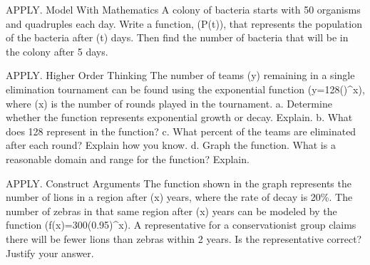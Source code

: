 \documentclass{article}
\newenvironment{practice}[2]{}{}        %
\newcommand{\answer}[1]{}               %
\newcommand{\placeholder}[2]{}          %
\newcommand{\te}[1]{}                   %
\begin{document}
\begin{practice}{27}{3}
APPLY. Model With Mathematics A colony of bacteria starts with 50 organisms and quadruples each day. Write a function, (P(t)), that represents the population of the bacteria after (t) days. Then find the number of bacteria that will be in the colony after 5 days.
\placeholder{illustration}{Two circular petri dishes containing green rod-shaped bacteria. Left sparse dish callout DAY 0: 50. Orange arrow points right to densely filled dish labeled DAY 5: ?.}
\answer{(P(t)=50(4)^x); 51,200 bacteria}
\te{Printed formula uses (x) although the function and prompt use (t); likely (P(t)=50(4)^t).}
\end{practice}
\begin{practice}{28}{2}
APPLY. Higher Order Thinking The number of teams (y) remaining in a single elimination tournament can be found using the exponential function (y=128()^x), where (x) is the number of rounds played in the tournament.
a. Determine whether the function represents exponential growth or decay. Explain.
b. What does 128 represent in the function?
c. What percent of the teams are eliminated after each round? Explain how you know.
d. Graph the function. What is a reasonable domain and range for the function? Explain.
\answer{a. decay; The base is less than 1. b. the initial number of teams in the tournament c. 50\%; the rate of decay is (\frac12). d. domain: (\{1,2,3,4,5,6,7\}); range: (\{1,2,4,8,16,32,64\}); the function only makes sense for 7 rounds. After the seventh round, there is only one team remaining.}
\placeholder{graph}{Answer 28d: seven isolated red filled points (1,64),(2,32),(3,16),(4,8),(5,4),(6,2),(7,1). No connecting segments. x window -2 to 10, grid step 1, labels 2,4,6,8; y window about -7.5 to 75, grid step 7.5, labels 15,30,45,60. Axes x,y arrows both ends, O at origin.}
\end{practice}
\begin{practice}{29}{2}
APPLY. Construct Arguments The function shown in the graph represents the number of lions in a region after (x) years, where the rate of decay is 20\%. The number of zebras in that same region after (x) years can be modeled by the function (f(x)=300(0.95)^x). A representative for a conservationist group claims there will be fewer lions than zebras within 2 years. Is the representative correct? Justify your answer.
\placeholder{graph}{Lion Population: blue decreasing curve with marked/labeled points (0,400),(4,164),(5,131), arrow at right near (9,55). Horizontal Years, x, from 0 to 10, grid step 1 and labels 0,2,4,6,8,10. Vertical Lions, f(x), from 0 to 1000, grid step 100 and labels 0,200,400,600,800,1000. Positive-axis arrows; curve approaches y=0.}
\answer{Yes; After 2 years, there will be about 271 zebras left and about 256 lions left.}
\end{practice}
\end{document}
